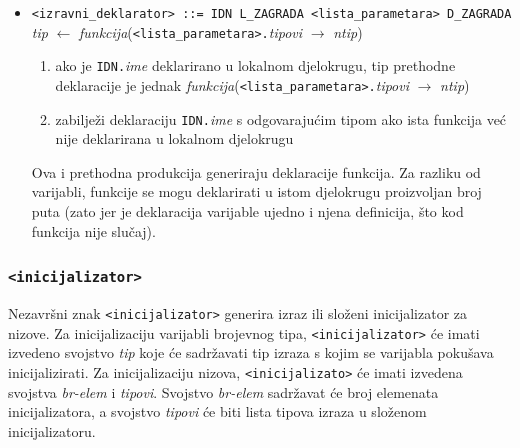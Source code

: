 \documentclass[times, 12pt, utf8]{book}
\begin{document}
\begin{itemize}
\item
\verb|<izravni_deklarator> ::= IDN L_ZAGRADA <lista_parametara> D_ZAGRADA|\\
\emph{tip} \(\leftarrow\) \emph{funkcija}(\verb|<lista_parametara>.|\emph{tipovi} \(\to\) \emph{ntip})
\begin{enumerate}
\item
ako je \verb|IDN.|\emph{ime} deklarirano u lokalnom djelokrugu, tip prethodne deklaracije je jednak \emph{funkcija}(\verb|<lista_parametara>.|\emph{tipovi} \(\to\) \emph{ntip})
\item
zabilježi deklaraciju \verb|IDN.|\emph{ime} s odgovarajućim tipom ako ista funkcija već nije deklarirana u lokalnom djelokrugu
\end{enumerate}

Ova i prethodna produkcija generiraju deklaracije funkcija.
Za razliku od varijabli, funkcije se mogu deklarirati u istom djelokrugu proizvoljan broj puta (zato jer je deklaracija varijable ujedno i njena definicija, što kod funkcija nije slučaj).

\end{itemize}


\subsubsection{\texttt{<inicijalizator>}}

Nezavršni znak \verb|<inicijalizator>| generira izraz ili složeni inicijalizator za nizove.
Za inicijalizaciju varijabli brojevnog tipa, \verb|<inicijalizator>| će imati izvedeno svojstvo \emph{tip} koje će sadržavati tip izraza s kojim se varijabla pokušava inicijalizirati.
Za inicijalizaciju nizova, \verb|<inicijalizato>| će imati izvedena svojstva \emph{br-elem} i \emph{tipovi}.
Svojstvo \emph{br-elem} sadržavat će broj elemenata inicijalizatora, a svojstvo \emph{tipovi} će biti lista tipova izraza u složenom inicijalizatoru.
\end{document}
